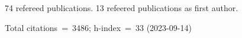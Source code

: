 74 refereed publications. 13 refeered publications as first author.

Total citations~=~3486; h-index~=~33 (2023-09-14)